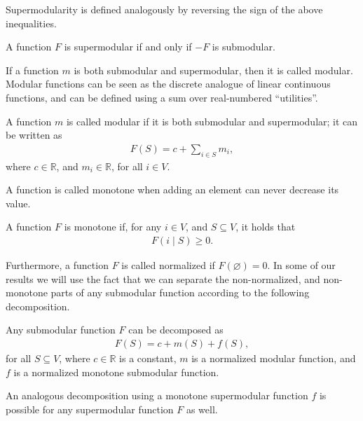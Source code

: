 Supermodularity is defined analogously by reversing the sign of the above inequalities.
\begin{definition}[Supermodularity] \label{def:supermod}
A function $F$ is supermodular if and only if $-F$ is submodular.
\end{definition}

If a function $m$ is both submodular and supermodular, then it is called modular.
Modular functions can be seen as the discrete analogue of linear continuous functions, and can be defined using a sum over real-numbered ``utilities''.
\begin{definition}[Modularity]
A function $m$ is called modular if it is both submodular and supermodular; it can be written as
\begin{align*}
F(S) = c + \sum_{i \in S} m_i,
\end{align*}
where $c \in \mathbb{R}$, and $m_i \in \mathbb{R}$, for all $i \in V$.
\end{definition}

A function is called monotone when adding an element can never decrease its value.
\begin{definition}[Monotonicity]
A function $F$ is monotone if, for any $i \in V$, and $S \subseteq V$, it holds that
\begin{align*}
F(i \mid S) \geq 0.
\end{align*}
\end{definition}
Furthermore, a function $F$ is called normalized if $F(\varnothing) = 0$.
In some of our results we will use the fact that we can separate the non-normalized, and non-monotone parts of any submodular function according to the following decomposition.
\begin{definition} \label{def:decomp}
Any submodular function $F$ can be decomposed as
\begin{align*} %
  F(S) = c + m(S) + f(S),
\end{align*}
for all $S \subseteq V$, where $c \in \mathbb{R}$ is a constant, $m$ is a normalized modular function, and $f$ is a normalized monotone submodular function.
\end{definition}
An analogous decomposition using a monotone supermodular function $f$ is possible for any supermodular function $F$ as well.

